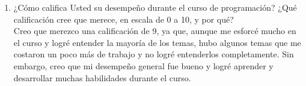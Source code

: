 \begin{enumerate}
\begin{itemize}
\item Es un gran profesor, siempre amable y dispuesto a ayudar a los estudiantes, ya sea resolviendo dudas o explicando varias veces con diferentes enfoques para que se entienda el tema.
\item El curso es muy interesante, se abordan temas muy relevantes en el campo de la inteligencia artificial y la optimización combinatoria, y se aplican a problemas reales.
\item El curso es muy completo, se abordan tanto la teoría como la práctica de los algoritmos, lo que permite a los estudiantes tener una comprensión profunda de los temas tratados.
\end{itemize}
\item ¿Cómo califica Usted su desempeño durante el curso de programación? ¿Qué calificación cree que merece, en escala de 0 a 10, y por qué?\\
Creo que merezco una calificación de 9, ya que, aunque me esforcé mucho en el curso y logré entender la mayoría de los temas, hubo algunos temas que me costaron un poco más de trabajo y no logré entenderlos completamente.
Sin embargo, creo que mi desempeño general fue bueno y logré aprender y desarrollar muchas habilidades durante el curso.
\end{enumerate}
